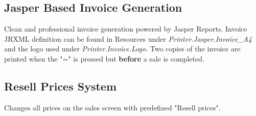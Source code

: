 \subsection{Jasper Based Invoice Generation}

Clean and professional invoice generation powered by Jasper Reports. Invoice JRXML definition can be found in Resources under \textit{Printer.Jasper.Invoice\_A4} and the logo used under \textit{Printer.Invoice.Logo}. Two copies of the invoice are printed when the "=" is pressed but \textbf{before} a sale is completed.

\subsection{Resell Prices System}

Changes all prices on the sales screen with predefined "Resell prices".